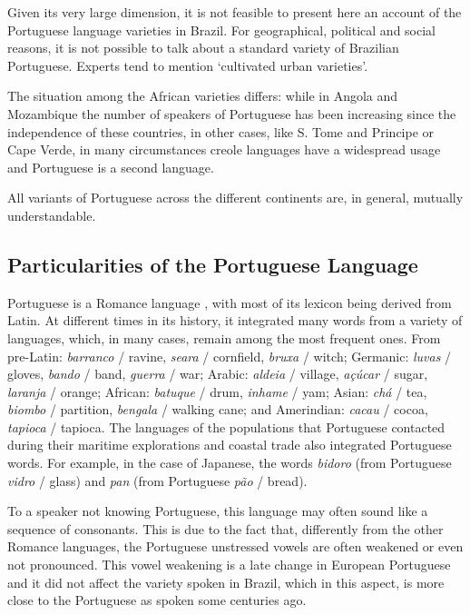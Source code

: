 \begin{multicols}{2}
Given its very large dimension, it is not feasible to present here an account of the Portuguese language varieties in Brazil. 
For geographical, political and social reasons, it is not possible to talk about a standard variety of Brazilian Portuguese. 
Experts tend to mention ‘cultivated urban varieties’. 

The situation among the African varieties differs: while in Angola and Mozambique the number of speakers of Portuguese has been increasing since the independence of these countries, in other cases, like S. Tome and Principe or Cape Verde, in many circumstances creole languages have a widespread usage and Portuguese is a second language.

All variants of Portuguese across the different continents are, in general, mutually understandable.

\subsection{Particularities of the Portuguese Language}

Portuguese is a Romance language \cite{cardeira}, with most of its lexicon being derived from Latin. 
At different times in its history, it integrated many words from a variety of languages, which, in many cases, remain among 
the most frequent ones. From pre-Latin: \textit{barranco} / ravine, \textit{seara} / cornfield,  \textit{bruxa} / witch; Germanic:  \textit{luvas} / gloves,  \textit{bando} / band,  \textit{guerra} / war; Arabic:  \textit{aldeia} / village,  \textit{açúcar} / sugar,  \textit{laranja} / orange; African: \textit{batuque} / drum, \textit{inhame} / yam; Asian: \textit{chá} / tea, \textit{biombo} / partition, \textit{bengala} / walking cane; and Amerindian: \textit{cacau} / cocoa, \textit{tapioca} / tapioca. The languages of the populations that Portuguese contacted during their maritime explorations and coastal trade also integrated Portuguese words. For example, in the case of Japanese, the words \textit{bidoro} (from Portuguese \textit{vidro} / glass) and \textit{pan} (from Portuguese \textit{pão} / bread).


To a speaker not knowing Portuguese, this language may often sound like a sequence of consonants. 
This is due to the fact that, differently from the other Romance languages, the Portuguese unstressed vowels are often weakened 
or even not pronounced. This vowel weakening is a late change in European Portuguese and it did not 
affect the variety spoken in Brazil, which in this aspect, is more close to the Portuguese as spoken some centuries ago.


\end{multicols}

